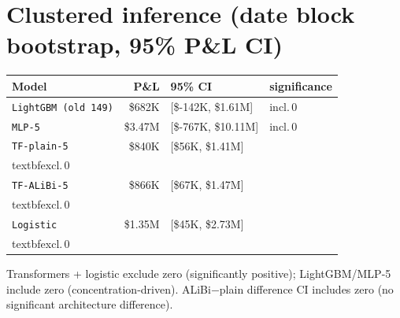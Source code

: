 \documentclass[11pt]{article}
\newcommand{\code}[1]{\texttt{\small #1}}
\begin{document}
\section{Clustered inference (date block bootstrap, 95\% P\&L CI)}
\begin{center}\footnotesize
\begin{tabular}{l r l l}
\toprule Model & P\&L & 95\% CI & significance \\\midrule
\code{LightGBM (old 149)} & \$682K & [\$-142K, \$1.61M] & incl.\,0 \\
\code{MLP-5} & \$3.47M & [\$-767K, \$10.11M] & incl.\,0 \\
\code{TF-plain-5} & \$840K & [\$56K, \$1.41M] & \\textbf{excl.\,0} \\
\code{TF-ALiBi-5} & \$866K & [\$67K, \$1.47M] & \\textbf{excl.\,0} \\
\code{Logistic} & \$1.35M & [\$45K, \$2.73M] & \\textbf{excl.\,0} \\
\bottomrule\end{tabular}\end{center}
\noindent Transformers + logistic exclude zero (significantly positive); LightGBM/MLP-5 include zero
(concentration-driven). ALiBi$-$plain difference CI includes zero (no significant architecture difference).
\end{document}
